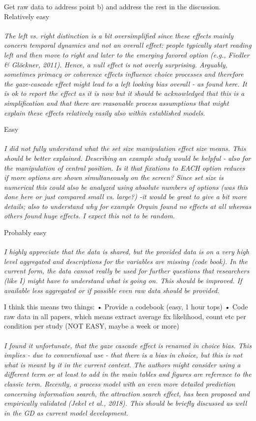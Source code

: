 \documentclass[english,natbib,man,floatsintext]{apa6}
\newcommand\eatpunct[1]{}
\newcommand{\com}[2][]{\vspace{5mm}\paragraph[ ]{ \eatpunct}\label{#1}\emph{#2}\vspace{5mm}}
\begin{document}
Get raw data to address point b) and address the rest in the discussion. Relatively easy

\com[com-r3-XX]{The left vs. right distinction is a bit oversimplified since these effects mainly concern temporal dynamics and not an overall effect: people typically start reading left and then move to right and later to the emerging favored option (e.g., Fiedler \& Glöckner, 2011). Hence, a null effect is not overly surprising. Arguably, sometimes primacy or coherence effects influence choice processes and therefore the gaze-cascade effect might lead to a left looking bias overall - as found here. It is ok to report the effect as it is now but it should be acknowledged that this is a simplification and that there are reasonable process assumptions that might explain these effects relatively easily also within established models.}

Easy 


\com[com-r3-XX]{I did not fully understand what the set size manipulation effect size means. This should be better explained. Describing an example study would be helpful - also for the manipulation of central position. Is it that fixations to EACH option reduces if more options are shown simultaneously on the screen? Since set size is numerical this could also be analyzed using absolute numbers of options (was this done here or just compared small vs. large?) -it would be great to give a bit more details; also to understand why for example Orquin found no effects at all whereas others found huge effects. I expect this not to be random.}

Probably easy 


\com[com-r3-XX]{I highly appreciate that the data is shared, but the provided data is on a very high level aggregated and descriptions for the variables are missing (code book). In the current form, the data cannot really be used for further questions that researchers (like I) might have to understand what is going on. This should be improved. If available less aggregated or if possible even raw data should be provided.}

I think this means two things:
    • Provide a codebook (easy, 1 hour tops)
    • Code raw data in all papers, which means extract average fix likelihood, count etc per condition per study (NOT EASY, maybe a week or more)

\com[com-r3-XX]{I found it unfortunate, that the gaze cascade effect is renamed in choice bias. This implies - due to conventional use - that there is a bias in choice, but this is not what is meant by it in the current context. The authors might consider using a different term or at least to add in the main tables and figures are reference to the classic term. Recently, a process model with an even more detailed prediction concerning information search, the attraction search effect, has been proposed and empirically validated (Jekel et al., 2018). This should be briefly discussed as well in the GD as current model development.}
\end{document}
